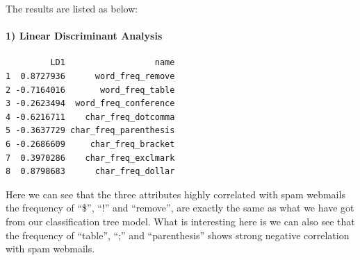\documentclass[
  11pt,
]{article}
\newenvironment{Shaded}{\begin{snugshade}}{\end{snugshade}}
\newcommand{\AttributeTok}[1]{\textcolor[rgb]{0.77,0.63,0.00}{#1}}
\newcommand{\FloatTok}[1]{\textcolor[rgb]{0.00,0.00,0.81}{#1}}
\newcommand{\FunctionTok}[1]{\textcolor[rgb]{0.00,0.00,0.00}{#1}}
\newcommand{\NormalTok}[1]{#1}
\newcommand{\OtherTok}[1]{\textcolor[rgb]{0.56,0.35,0.01}{#1}}
\newcommand{\SpecialCharTok}[1]{\textcolor[rgb]{0.00,0.00,0.00}{#1}}
\newcommand{\StringTok}[1]{\textcolor[rgb]{0.31,0.60,0.02}{#1}}
\begin{document}
The results are listed as below:

\hypertarget{linear-discriminant-analysis-1}{%
\paragraph{1) Linear Discriminant Analysis}\label{linear-discriminant-analysis-1}}

\begin{Shaded}
\end{Shaded}

\begin{verbatim}
         LD1                  name
1  0.8727936      word_freq_remove
2 -0.7164016       word_freq_table
3 -0.2623494  word_freq_conference
4 -0.6216711    char_freq_dotcomma
5 -0.3637729 char_freq_parenthesis
6 -0.2686609     char_freq_bracket
7  0.3970286    char_freq_exclmark
8  0.8798683      char_freq_dollar
\end{verbatim}

Here we can see that the three attributes highly correlated with spam webmails the frequency of ``\$'', ``!'' and ``remove'', are exactly the same as what we have got from our classification tree model. What is interesting here is we can also see that the frequency of ``table'', ``;'' and ``parenthesis'' shows strong negative correlation with spam webmails.
\end{document}
